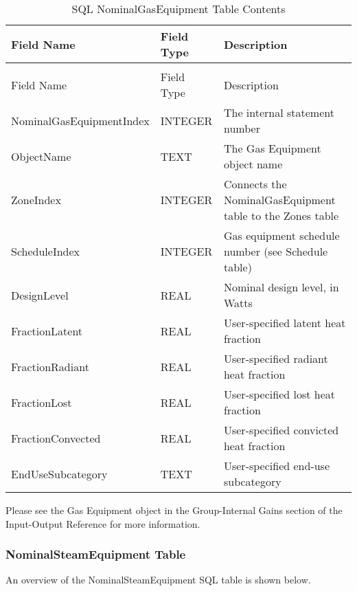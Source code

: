 {\scriptsize
\begin{longtable}[c]{>{\raggedright}p{1.5in}>{\raggedright}p{1.5in}>{\raggedright}p{3.0in}}
\caption{SQL NominalGasEquipment Table Contents \label{table:table-18.-sql-nominalgasequipment-table}} \tabularnewline
\toprule 
Field Name & Field Type & Description \tabularnewline
\midrule
\endfirsthead

\caption[]{SQL NominalGasEquipment Table Contents} \tabularnewline
\toprule 
Field Name & Field Type & Description \tabularnewline
\midrule
\endhead

Nominal\-Gas\-Equipment\-Index & INTEGER & The internal statement number \tabularnewline
ObjectName & TEXT & The Gas Equipment object name \tabularnewline
ZoneIndex & INTEGER & Connects the NominalGasEquipment table to the Zones table \tabularnewline
ScheduleIndex & INTEGER & Gas equipment schedule number (see Schedule table) \tabularnewline
DesignLevel & REAL & Nominal design level, in Watts \tabularnewline
FractionLatent & REAL & User-specified latent heat fraction \tabularnewline
FractionRadiant & REAL & User-specified radiant heat fraction \tabularnewline
FractionLost & REAL & User-specified lost heat fraction \tabularnewline
FractionConvected & REAL & User-specified convicted heat fraction \tabularnewline
EndUseSubcategory & TEXT & User-specified end-use subcategory \tabularnewline
\bottomrule
\end{longtable}}

Please see the Gas Equipment object in the Group-Internal Gains section of the Input-Output Reference for more information.

\subsubsection{NominalSteamEquipment Table}

An overview of the NominalSteamEquipment SQL table is shown below.

